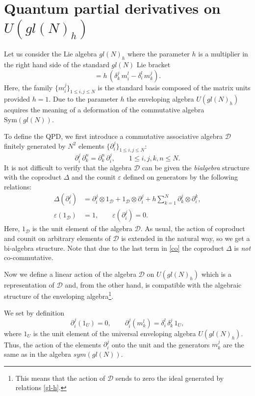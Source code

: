 \documentclass[10pt,a4paper]{amsart}
\newcommand{\pa}{\partial}
\newcommand{\hl}{m}
\newcommand{\de}{\delta}
\newcommand{\De}{\Delta}
\newcommand{\ot}{\otimes}
\newcommand{\DD}{\mathcal{D}}
\numberwithin{equation}{section}
\begin{document}
\section[Quantum partial derivatives on U(gl(N)h)]{Quantum partial derivatives on $U(gl(N)_h)$}
\label{sec:2}

Let us consider the Lie algebra $gl(N)_h$ where the parameter $h$ is a multiplier in the right hand side of the standard
$gl(N)$ Lie bracket
\begin{equation}
[\hl_i^j\,, \hl_k^l]=h\,(\de_k^j\, \hl_i^l-\de_i^l\, \hl_k^j).
\label{gl-h}
\end{equation}
Here, the family $\{\hl_i^j\}_{1\leq i,j\leq N}$ is the standard   basis composed of  the matrix units provided $h=1$. Due to the parameter $h$ the enveloping algebra $U(gl(N)_h)$
acquires the meaning of a deformation of the commutative algebra $\mathrm{Sym}(gl(N))$.

To define the QPD, we first introduce a commutative associative algebra $\DD$ finitely generated by $N^2$ elements
$\{\partial_i^j\}_{1\le i,j\le N}$:
\[
\partial_i^j\,\partial_k^n = \partial_k^n\,\partial_i^j,\qquad 1\le i,j,k,n\le N.
\]
It is not difficult to verify that the algebra $\DD$ can be given the \emph{bialgebra} structure with the coproduct $\Delta$
and the counit $\varepsilon$ defined on generators by the following relations:
\begin{align}
\De(\pa_i^j) &= \pa_i^j\ot 1_\DD+1_\DD\ot \pa_i^j
+h\sum_{k=1}^N \pa^j_k\ot \pa_i^k, \label{co}\\
\varepsilon(1_\DD) &= 1, \qquad \varepsilon(\partial_i^j)=0. \label{coun}
\end{align}
Here, $1_\DD$ is the unit element of the algebra $\DD$. As usual, the action of coproduct and counit on arbitrary elements of $\DD$
is extended in the natural way, so we get a bi-algebra structure. Note that due to the last term in \eqref{co} the coproduct $\Delta$ is \emph{not}
co-commutative.

Now we define a linear action of the algebra $\DD$ on $U(gl(N)_h)$ which is a representation of $\DD$ and, from the other hand,
is compatible with the algebraic structure of the enveloping algebra\footnote{This means that the action of $\DD$ sends to zero the ideal generated by relations \eqref{gl-h}.}.

We set by definition
\begin{equation}
\partial_i^j(1_{U} ) = 0,\qquad \partial_i^j(\hl_k^l) = \delta_i^l\,\delta_k^j\,1_U,
\label{gen-act}
\end{equation}
where $1_U$ is the unit element of the universal enveloping algebra $U(gl(N)_h)$. Thus, the action of the elements $\pa_i^j$ onto the unit and the generators $m_k^j$ are the same as in the algebra $sym(gl(N))$. 
\end{document}
